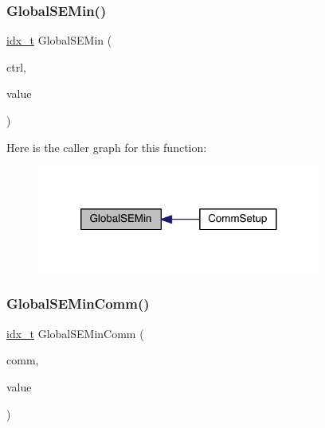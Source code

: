 \mbox{\label{a00344_a7cffea998f35ba1b59fe0726bee38fc9}} 
\subsubsection{\texorpdfstring{Global\+S\+E\+Min()}{GlobalSEMin()}}
{\footnotesize\ttfamily \hyperlink{a00876_aaa5262be3e700770163401acb0150f52}{idx\+\_\+t} Global\+S\+E\+Min (\begin{DoxyParamCaption}\item[{\hyperlink{a00742}{ctrl\+\_\+t} $\ast$}]{ctrl,  }\item[{\hyperlink{a00876_aaa5262be3e700770163401acb0150f52}{idx\+\_\+t}}]{value }\end{DoxyParamCaption})}

Here is the caller graph for this function\+:\nopagebreak
\begin{figure}[H]
\begin{center}
\leavevmode
\includegraphics[width=264pt]{a00344_a7cffea998f35ba1b59fe0726bee38fc9_icgraph}
\end{center}
\end{figure}
\mbox{\label{a00344_a44bc5168b7fcc675e4e07293a712f12b}} 
\subsubsection{\texorpdfstring{Global\+S\+E\+Min\+Comm()}{GlobalSEMinComm()}}
{\footnotesize\ttfamily \hyperlink{a00876_aaa5262be3e700770163401acb0150f52}{idx\+\_\+t} Global\+S\+E\+Min\+Comm (\begin{DoxyParamCaption}\item[{M\+P\+I\+\_\+\+Comm}]{comm,  }\item[{\hyperlink{a00876_aaa5262be3e700770163401acb0150f52}{idx\+\_\+t}}]{value }\end{DoxyParamCaption})}

